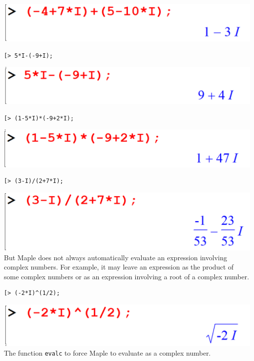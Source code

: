 \documentclass[
]{book}
\theoremstyle{definition}
\theoremstyle{definition}
\theoremstyle{definition}
\theoremstyle{definition}
\theoremstyle{remark}
\begin{document}
\includegraphics{figures/Lesson 1/fig42.png}

\begin{verbatim}
[> 5*I-(-9+I);
\end{verbatim}

\includegraphics{figures/Lesson 1/fig43.png}

\begin{verbatim}
[> (1-5*I)*(-9+2*I);
\end{verbatim}

\includegraphics{figures/Lesson 1/fig44.png}

\begin{verbatim}
[> (3-I)/(2+7*I);
\end{verbatim}

\includegraphics{figures/Lesson 1/fig45.png}
But Maple does not always automatically evaluate an expression involving complex numbers.
For example, it may leave an expression as the product of some complex numbers or as an expression involving a root of a complex number.

\begin{verbatim}
[> (-2*I)^(1/2);
\end{verbatim}

\includegraphics{figures/Lesson 1/fig46.png}
The function \texttt{evalc} to force Maple to evaluate as a complex number.
\end{document}
